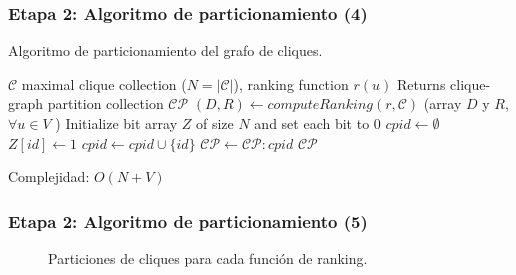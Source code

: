 \begin{frame}
\frametitle{Etapa 2: Algoritmo de particionamiento (4)}

\begin{algorithm}[H]
\caption{\footnotesize Algoritmo de particionamiento del grafo de cliques.}
\begin{algorithmic}[1]
\scriptsize
\REQUIRE $\mathcal{C}$ maximal clique collection ($N=|\mathcal{C}|$), ranking function $r(u)$
\ENSURE Returns clique-graph partition collection $\mathcal{C}\mathcal{P}$
\STATE $(D,R) \leftarrow computeRanking(r,\mathcal{C})$ (array $D$ y $R$, $\forall u \in V$ ) \label{alg:clustering:rankarray} 
\STATE Initialize bit array $Z$ of size $N$ and set each bit to 0
    \STATE $cpid \leftarrow \emptyset$
          \STATE $Z[id] \leftarrow 1$
          \STATE $cpid \leftarrow cpid \cup \{id\}$
    \ENDFOR
      \STATE $\mathcal{C}\mathcal{P} \leftarrow \mathcal{C}\mathcal{P} : cpid$
    \ENDIF 
 \ENDFOR
\RETURN $\mathcal{C}\mathcal{P}$
\end{algorithmic}
\end{algorithm}

Complejidad: $O(N+V)$

\end{frame}		



\begin{frame}
\frametitle{Etapa 2: Algoritmo de particionamiento (5)}

\begin{figure}
    	\centering
    	
    	\begin{minipage}{\textwidth}
    		\footnotesize
    		\centering
    		
    	\end{minipage}
    	
    	\vspace{2mm}
    	\begin{minipage}{\textwidth}
    		\footnotesize
    		\centering
    		
    	\end{minipage}
    	
    	\vspace{2mm}
    \begin{minipage}{\textwidth}
    		\footnotesize
    		\centering
    		
    \end{minipage}
    
    	\caption{Particiones de cliques para cada función de ranking.}
    \label{fig:CPpartitions}
\end{figure}

\end{frame}




